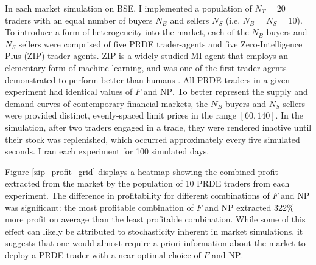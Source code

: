 \documentclass[conference]{IEEEtran}
\begin{document}
In each market simulation on BSE, I implemented a population of $N_T=20$ traders with an equal number of buyers $N_B$ and sellers $N_S$ (i.e. $N_B=N_S=10$).
To introduce a form of heterogeneity into the market, each of the $N_B$ buyers and $N_S$ sellers were comprised of five PRDE trader-agents and five Zero-Intelligence Plus (ZIP) \cite{ZIP} trader-agents.
ZIP is a widely-studied MI agent that employs an elementary form of machine learning, and was one of the first trader-agents demonstrated to perform better than humans \cite{DasHansonKephartTesauro}.
All PRDE traders in a given experiment had identical values of $F$ and $\mathrm{NP}$.
To better represent the supply and demand curves of contemporary financial markets, the $N_B$ buyers and $N_S$ sellers were provided distinct, evenly-spaced limit prices in the range $[60, 140]$.
In the simulation, after two traders engaged in a trade, they were rendered inactive until their stock was replenished, which occurred approximately every five simulated seconds.
I ran each experiment for 100 simulated days.

Figure \ref{zip_profit_grid} displays a heatmap showing the combined profit extracted from the market by the population of 10 PRDE traders from each experiment.
The difference in profitability for different combinations of $F$ and $\mathrm{NP}$ was significant: the most profitable combination of $F$ and $\mathrm{NP}$ extracted 322\% more profit on average than the least profitable combination.
While some of this effect can likely be attributed to stochasticity inherent in market simulations, it suggests that one would almost require a priori information about the market to deploy a PRDE trader with a near optimal choice of $F$ and $\mathrm{NP}$.
\end{document}

